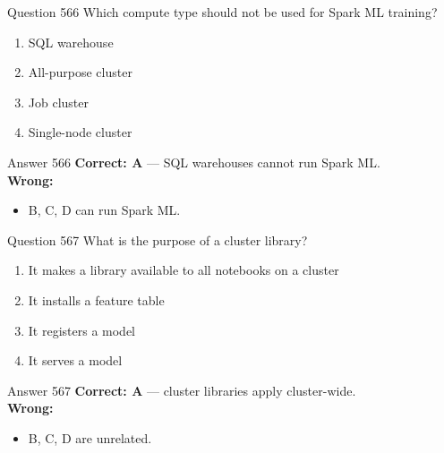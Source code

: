 \documentclass[aspectratio=169,11pt]{beamer}
\begin{document}
	\begin{frame}{Question 566}
		Which compute type should not be used for Spark ML training?
		\begin{enumerate}[label=\Alph*.]
			\item SQL warehouse
			\item All-purpose cluster
			\item Job cluster
			\item Single-node cluster
		\end{enumerate}
	\end{frame}
	\begin{frame}{Answer 566}
		\textbf{Correct: A} --- SQL warehouses cannot run Spark ML.\\
		\vspace{0.5em}
		\textbf{Wrong:}
		\begin{itemize}
			\item B, C, D can run Spark ML.
		\end{itemize}
	\end{frame}
	
	\begin{frame}{Question 567}
		What is the purpose of a cluster library?
		\begin{enumerate}[label=\Alph*.]
			\item It makes a library available to all notebooks on a cluster
			\item It installs a feature table
			\item It registers a model
			\item It serves a model
		\end{enumerate}
	\end{frame}
	\begin{frame}{Answer 567}
		\textbf{Correct: A} --- cluster libraries apply cluster-wide.\\
		\vspace{0.5em}
		\textbf{Wrong:}
		\begin{itemize}
			\item B, C, D are unrelated.
		\end{itemize}
	\end{frame}
	
\end{document}
